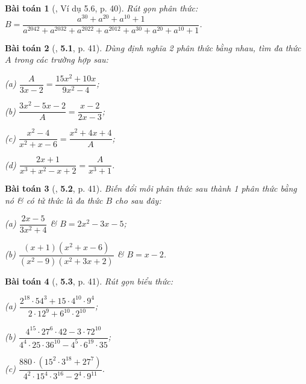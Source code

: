 \documentclass{article}
\numberwithin{equation}{section}
\newtheorem{baitoan}{Bài toán}[section]
\begin{document}
\begin{baitoan}[\cite{Binh_Nam_Ngoc_Son_Toan_8_Dai_So}, Ví dụ 5.6, p. 40]
	Rút gọn phân thức: $B = \dfrac{a^{30} + a^{20} + a^{10} + 1}{a^{2042} + a^{2032} + a^{2022} + a^{2012} + a^{30} + a^{20} + a^{10} + 1}$.
\end{baitoan}

\begin{baitoan}[\cite{Binh_Nam_Ngoc_Son_Toan_8_Dai_So}, \textbf{5.1}, p. 41]
	Dùng định nghĩa 2 phân thức bằng nhau, tìm đa thức $A$ trong các trường hợp sau:
	\begin{enumerate*}
		\item[(a)] $\dfrac{A}{3x - 2} = \dfrac{15x^2 + 10x}{9x^2 - 4}$;
		\item[(b)] $\dfrac{3x^2 - 5x - 2}{A} = \dfrac{x - 2}{2x - 3}$;
		\item[(c)] $\dfrac{x^2 - 4}{x^2 + x - 6} = \dfrac{x^2 + 4x + 4}{A}$;
		\item[(d)] $\dfrac{2x + 1}{x^3 + x^2 - x + 2} = \dfrac{A}{x^3 + 1}$.
	\end{enumerate*}
\end{baitoan}

\begin{baitoan}[\cite{Binh_Nam_Ngoc_Son_Toan_8_Dai_So}, \textbf{5.2}, p. 41]
	Biến đổi mỗi phân thức sau thành 1 phân thức bằng nó \& có tử thức là đa thức $B$ cho sau đây:
	\begin{enumerate*}
		\item[(a)] $\dfrac{2x - 5}{3x^2 + 4}$ \& $B = 2x^2 - 3x - 5$;
		\item[(b)] $\dfrac{(x + 1)(x^2 + x - 6)}{(x^2 - 9)(x^2 + 3x + 2)}$ \& $B = x - 2$.
	\end{enumerate*}
\end{baitoan}

\begin{baitoan}[\cite{Binh_Nam_Ngoc_Son_Toan_8_Dai_So}, \textbf{5.3}, p. 41]
	Rút gọn biểu thức:
	\begin{enumerate*}
		\item[(a)] $\dfrac{2^{18}\cdot 54^3 + 15\cdot 4^{10}\cdot 9^4}{2\cdot 12^9 + 6^{10}\cdot 2^{10}}$;
		\item[(b)] $\dfrac{4^{15}\cdot 27^6\cdot 42 - 3\cdot 72^{10}}{4^4\cdot 25\cdot 36^{10}  - 4^5\cdot 6^{19}\cdot 35}$;
		\item[(c)] $\dfrac{880\cdot(15^2\cdot 3^{18} + 27^7)}{4^2\cdot 15^4\cdot 3^{16} - 2^4\cdot 9^{11}}$.
	\end{enumerate*}
\end{baitoan}
\end{document}
